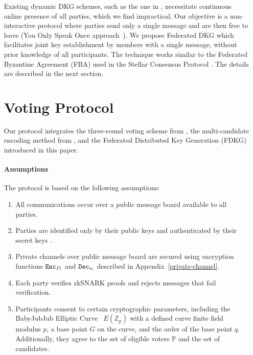 \documentclass[runningheads]{llncs}
\begin{document}
Existing dynamic DKG schemes, such as the one in \cite{delerableeDynamicThresholdPublickey2008}, necessitate continuous online presence of all parties, which we find impractical. Our objective is a non-interactive protocol where parties send only a single message and are then free to leave (You Only Speak Once approach~\cite{gentryYOSOYouOnly2021}). We propose Federated DKG which facilitates joint key establishment by members with a single message, without prior knowledge of all participants.
The technique works similar to the Federated Byzantine Agreement (FBA) used in the Stellar Consensus Protocol \cite{mazieresStellarConsensusProtocol2015}. The details are described in the next section.

\section{Voting Protocol}

Our protocol integrates the three-round voting scheme from \cite{schoenmakersLectureNotesCryptographic2018}, the multi-candidate encoding method from \cite{haoAnonymousVotingTworound2010}, and the Federated Distributed Key Generation (FDKG) introduced in this paper.

\paragraph*{Assumptions}
The protocol is based on the following assumptions:
\begin{enumerate}
\item All communications occur over a public message board available to all parties.
\item Parties are identified only by their public keys  and authenticated by their secret keys .
\item Private channels over public message board are secured using encryption functions $\texttt{Enc}_{P_{i}}$ and $\texttt{Dec}_{s_{i}}$ described in Appendix~\ref{private-channel}.
\item Each party verifies zkSNARK proofs and rejects messages that fail verification.
\item Participants consent to certain cryptographic parameters, including the BabyJubJub Elliptic Curve~\cite{whitehatBabyJubjubElliptic2020} $E(\mathbb{Z}_p)$ with a defined curve finite field modulus $p$, a base point $G$ on the curve, and the order of the base point $q$. Additionally, they agree to the set of eligible voters $\mathbb{P}$ and the set of candidates.
\end{enumerate}
\end{document}
